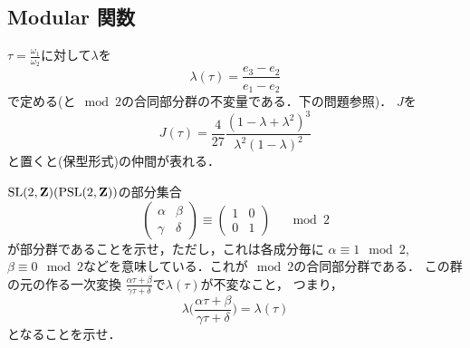 \subsection{Modular 関数}%
$\tau=\frac{\omega_1}{\omega_2}$に対して$\lambda$を
\[
	\lambda(\tau)
	=
	\frac{e_3-e_2}{e_1-e_2}
\]
で定める(と$\mod 2$の合同部分群の不変量である．下の問題参照)．
$J$を
\[
	J(\tau)
	=
	\frac{4}{27}
	\frac{(1-\lambda+\lambda^2)^3}{\lambda^2(1-\lambda)^2}%
\]
と置くと(保型形式)の仲間が表れる．
\begin{Quiz}
$\operatorname{SL}(2,\mathbf Z) ( \operatorname{PSL}(2,\mathbf Z)) $の部分集合
\[
	\begin{pmatrix}
		\alpha&\beta\\
		\gamma&\delta
	\end{pmatrix}
	\equiv
	\begin{pmatrix}
		1&0\\
		0&1
	\end{pmatrix}
	\quad\mod 2
\]
が部分群であることを示せ，ただし，これは各成分毎に
$\alpha\equiv1\mod 2$, $\beta\equiv0\mod 2$などを意味している．これが$\mod 2$の合同部分群である．
この群の元の作る一次変換
$\frac{\alpha\tau+\beta}{\gamma\tau+\delta}$で$\lambda(\tau)$が不変なこと，
つまり，
\[
	\lambda\biggl(\frac{\alpha\tau+\beta}
		{\gamma\tau+\delta}\biggr)
	=
	\lambda(\tau)
\]
となることを示せ．
\end{Quiz}



%   
%   
%   
%   
%   
%   
%   
%   
%   
%   
%   


